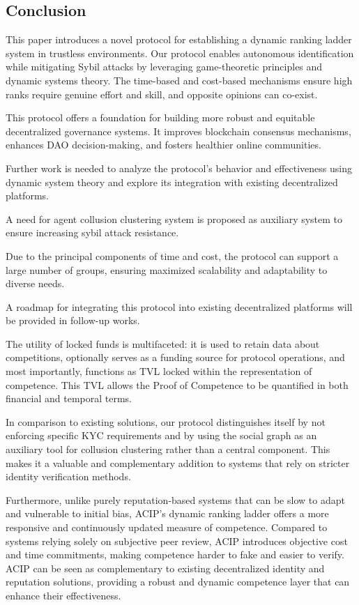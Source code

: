 \documentclass{article}
\begin{document}
\begin{CJK}{UTF8}{gbsn}
    \section{Conclusion}

    This paper introduces a novel protocol for establishing a dynamic ranking ladder system in trustless environments. Our protocol enables autonomous identification while mitigating Sybil attacks by leveraging game-theoretic principles and dynamic systems theory. The time-based and cost-based mechanisms ensure high ranks require genuine effort and skill, and opposite opinions can co-exist.

    This protocol offers a foundation for building more robust and equitable decentralized governance systems. It improves blockchain consensus mechanisms, enhances DAO decision-making, and fosters healthier online communities.

    Further work is needed to analyze the protocol's behavior and effectiveness using dynamic system theory and explore its integration with existing decentralized platforms.

    A need for agent collusion clustering system is proposed as auxiliary system to ensure increasing sybil attack resistance.

    Due to the principal components of time and cost, the protocol can support a large number of groups, ensuring maximized scalability and adaptability to diverse needs.

    A roadmap for integrating this protocol into existing decentralized platforms will be provided in follow-up works.

    The utility of locked funds is multifaceted: it is used to retain data about competitions, optionally serves as a funding source for protocol operations, and most importantly, functions as TVL locked within the representation of competence. This TVL allows the Proof of Competence to be quantified in both financial and temporal terms.

    In comparison to existing solutions, our protocol distinguishes itself by not enforcing specific KYC requirements and by using the social graph as an auxiliary tool for collusion clustering rather than a central component. This makes it a valuable and complementary addition to systems that rely on stricter identity verification methods.

        {{  Furthermore, unlike purely reputation-based systems that can be slow to adapt and vulnerable to initial bias, ACIP's dynamic ranking ladder offers a more responsive and continuously updated measure of competence.  Compared to systems relying solely on subjective peer review, ACIP introduces objective cost and time commitments, making competence harder to fake and easier to verify.  ACIP can be seen as complementary to existing decentralized identity and reputation solutions, providing a robust and dynamic competence layer that can enhance their effectiveness. }}

    \clearpage

    
    

    \clearpage\end{CJK}
\end{document}
